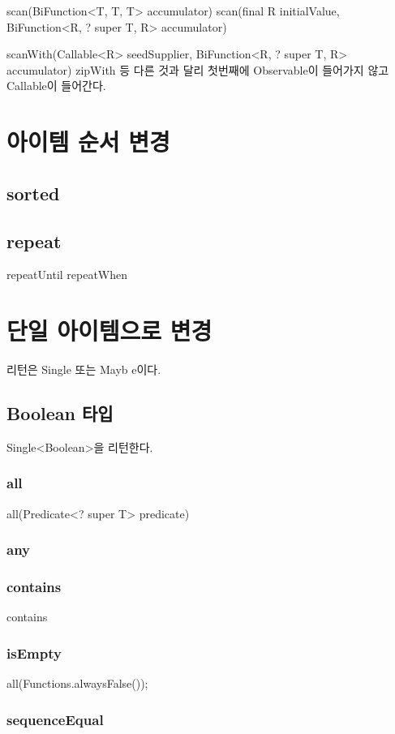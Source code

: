 \documentclass{book}
\begin{document}
{scan(BiFunction<T, T, T> accumulator)
scan(final R initialValue, BiFunction<R, ? super T, R> accumulator)

scanWith(Callable<R> seedSupplier, BiFunction<R, ? super T, R> accumulator)
zipWith 등 다른 것과 달리 첫번째에 Observable이 들어가지 않고 Callable이 들어간다.

\section{아이템 순서 변경}
\subsection{sorted}





\subsection{repeat}
repeatUntil
repeatWhen


\section{단일 아이템으로 변경}
리턴은 Single 또는  Mayb e이다.

\subsection{Boolean 타입}       
Single<Boolean>을 리턴한다.           
\subsubsection{all}
all(Predicate<? super T> predicate)

\subsubsection{any}

\subsubsection{contains}
contains

\subsubsection{isEmpty}
all(Functions.alwaysFalse());

\subsubsection{sequenceEqual}

}
\end{document}
